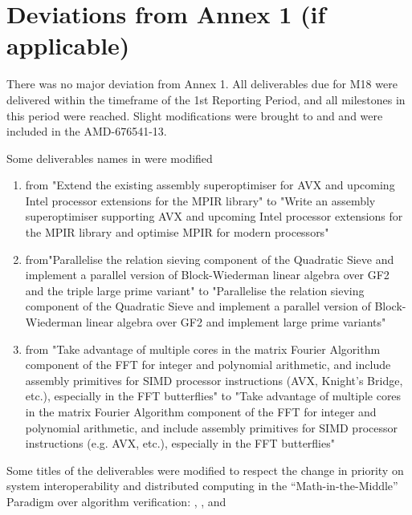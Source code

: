 \documentclass{deliverablereport}
\begin{document}
  \section{Deviations from Annex 1 (if applicable)}

There was no major deviation from Annex 1. All deliverables due for M18 were delivered
  within the timeframe of the 1st Reporting Period, and all milestones in this period were
  reached.  Slight modifications were brought to  and  and were
  included in the AMD-676541-13.

  Some deliverables names in  were modified
  \begin{enumerate}
  \item {} from "Extend the existing assembly
    superoptimiser for AVX and upcoming Intel processor extensions for the MPIR library"
    to "Write an assembly superoptimiser supporting AVX and upcoming Intel processor
    extensions for the MPIR library and optimise MPIR for modern processors"
  \item {} from"Parallelise the relation sieving component of the
    Quadratic Sieve and implement a parallel version of Block-Wiederman linear algebra
    over GF2 and the triple large prime variant" to "Parallelise the relation sieving
    component of the Quadratic Sieve and implement a parallel version of Block-Wiederman
    linear algebra over GF2 and implement large prime variants"
  \item {} from "Take advantage of multiple cores in the matrix Fourier
    Algorithm component of the FFT for integer and polynomial arithmetic, and include
    assembly primitives for SIMD processor instructions (AVX, Knight's Bridge, etc.),
    especially in the FFT butterflies" to "Take advantage of multiple cores in the matrix
    Fourier Algorithm component of the FFT for integer and polynomial arithmetic, and
    include assembly primitives for SIMD processor instructions (e.g. AVX, etc.),
    especially in the FFT butterflies"
  \end{enumerate}

  Some titles of the  deliverables were modified to respect the change in
  priority on system interoperability and distributed computing in the
  ``Math-in-the-Middle'' Paradigm over algorithm verification:
  , , and
\end{document}

